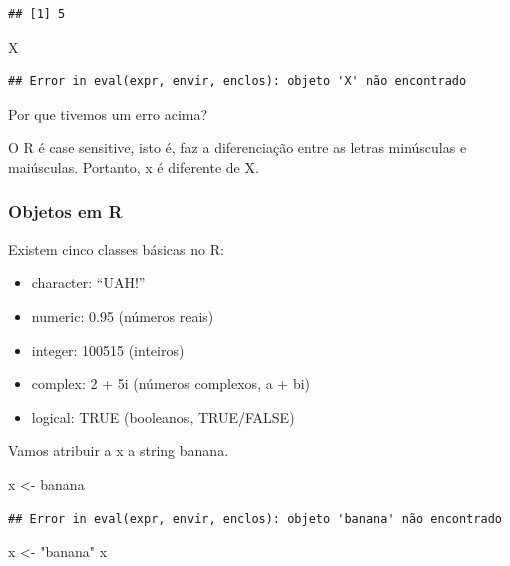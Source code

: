 \documentclass[
]{book}
\newenvironment{Shaded}{\begin{snugshade}}{\end{snugshade}}
\newcommand{\NormalTok}[1]{#1}
\newcommand{\StringTok}[1]{\textcolor[rgb]{0.31,0.60,0.02}{#1}}
\begin{document}
\begin{verbatim}
## [1] 5
\end{verbatim}

\begin{Shaded}
\begin{Highlighting}[]
\NormalTok{X}
\end{Highlighting}
\end{Shaded}

\begin{verbatim}
## Error in eval(expr, envir, enclos): objeto 'X' não encontrado
\end{verbatim}

Por que tivemos um erro acima?

O R é case sensitive, isto é, faz a diferenciação entre as letras minúsculas e maiúsculas. Portanto, x é diferente de X.

\hypertarget{objetos-em-r}{%
\subsubsection{Objetos em R}\label{objetos-em-r}}

Existem cinco classes básicas no R:

\begin{itemize}
\item
  character: ``UAH!''
\item
  numeric: 0.95 (números reais)
\item
  integer: 100515 (inteiros)
\item
  complex: 2 + 5i (números complexos, a + bi)
\item
  logical: TRUE (booleanos, TRUE/FALSE)
\end{itemize}

Vamos atribuir a x a string banana.

\begin{Shaded}
\begin{Highlighting}[]
\NormalTok{x <-}\StringTok{ }\NormalTok{banana }
\end{Highlighting}
\end{Shaded}

\begin{verbatim}
## Error in eval(expr, envir, enclos): objeto 'banana' não encontrado
\end{verbatim}

\begin{Shaded}
\begin{Highlighting}[]
\NormalTok{x <-}\StringTok{ "banana"}
\NormalTok{x}
\end{Highlighting}
\end{Shaded}
\end{document}
